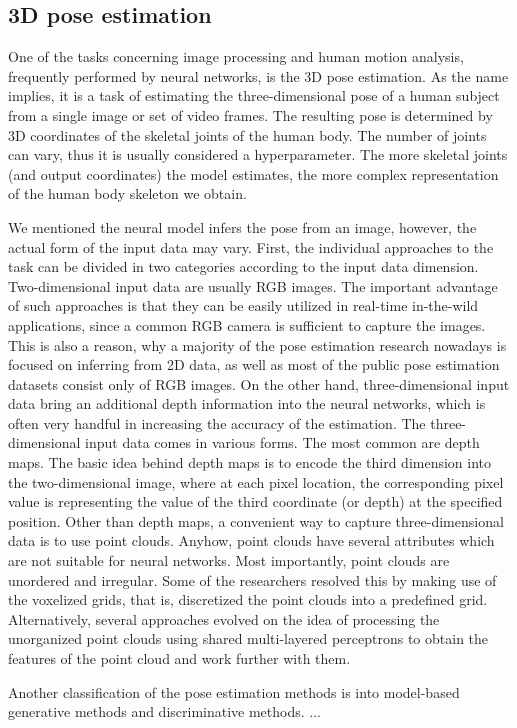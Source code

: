 \subsection{3D pose estimation}
One of the tasks concerning image processing and human motion analysis, frequently performed by neural networks, is the 3D pose estimation. As the name implies, it is a task of estimating the three-dimensional pose of a human subject from a single image or set of video frames. The resulting pose is determined by 3D coordinates of the skeletal joints of the human body. The number of joints can vary, thus it is usually considered a hyperparameter. The more skeletal joints (and output coordinates) the model estimates, the more complex representation of the human body skeleton we obtain.\par
\vspace{5mm}
\noindent
We mentioned the neural model infers the pose from an image, however, the actual form of the input data may vary. First, the individual approaches to the task can be divided in two categories according to the input data dimension. Two-dimensional input data are usually RGB images. The important advantage of such approaches is that they can be easily utilized in real-time in-the-wild applications, since a common RGB camera is sufficient to capture the images. This is also a reason, why a majority of the pose estimation research nowadays is focused on inferring from 2D data, as well as most of the public pose estimation datasets consist only of RGB images. On the other hand, three-dimensional input data bring an additional depth information into the neural networks, which is often very handful in increasing the accuracy of the estimation. The three-dimensional input data comes in various forms. The most common are depth maps. The basic idea behind depth maps is to encode the third dimension into the two-dimensional image, where at each pixel location, the corresponding pixel value is representing the value of the third coordinate (or depth) at the specified position. Other than depth maps, a convenient way to capture three-dimensional data is to use point clouds. Anyhow, point clouds have several attributes which are not suitable for neural networks. Most importantly, point clouds are unordered and irregular. Some of the researchers resolved this by making use of the voxelized grids, that is, discretized the point clouds into a predefined grid. Alternatively, several approaches evolved on the idea of processing the unorganized point clouds using shared multi-layered perceptrons to obtain the features of the point cloud and work further with them.\par
\vspace{5mm}
\noindent
Another classification of the pose estimation methods is into model-based generative methods and discriminative methods. 
...


